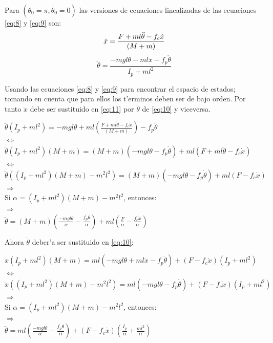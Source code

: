 Para $(\theta_{0}=\pi,\dot{\theta_{0}}=0)$ las versiones de ecuaciones linealizadas de las ecuaciones \ref{eq:8} y \ref{eq:9} son:
\setlength{\parskip}{0pt}
\begin{equation}\label{eq:10} 
\,\ddot{x}=\frac{F+ml\ddot{\theta}-f_{c}\dot{x}}{(M+m)}\\
\end{equation}
\begin{equation}\label{eq:11}
\,\ddot{\theta}=\frac{-mgl\theta-ml\ddot{x}-f_{p}\dot{\theta}}{I_{p}+ml^{2}}
\end{equation}
\setlength{\parskip}{0.4cm}


Usando las ecuaciones \ref{eq:8} y \ref{eq:9} para encontrar el espacio de estados; tomando en cuenta que para ellos los t'erminos deben ser de bajo orden. Por tanto $\ddot{x}$ debe ser sustituido en \ref{eq:11} por $\ddot{\theta}$ de \ref{eq:10} y viceversa.

\setlength{\parskip}{0pt}

\begin{center}
$\ddot{\theta}(I_{p}+ml^{2})=-mgl\theta+ml(\frac{F+ml\ddot{\theta}-f_{c}\dot{x}}{(M+m)})-f_{p}\dot{\theta}$\\
$\Leftrightarrow $\\
$\ddot{\theta}(I_{p}+ml^{2})(M+m)=(M+m)(-mgl\theta-f_{p}\dot{\theta})+ml(F+ml\ddot{\theta}-f_{c}\dot{x})$\\
$\Leftrightarrow $\\
$\ddot{\theta}((I_{p}+ml^{2})(M+m)-m^{2}l^{2})=(M+m)(-mgl\theta-f_{p}\dot{\theta})+ml(F-f_{c}\dot{x})$\\
$\Rightarrow $\\
Si $\alpha=(I_{p}+ml^{2})(M+m)-m^{2}l^{2}$, entonces:\\
$\Rightarrow $\\
$\ddot{\theta}=(M+m)(\frac{-mgl\theta}{\alpha}-\frac{f_{p}\dot{\theta}}{\alpha})+ml(\frac{F}{\alpha}-\frac{f_{c}\dot{x}}{\alpha})$\\
\end{center}

Ahora $\dot{\theta}$ deber'a ser sustituido en \ref{eq:10}:

\begin{center}
$\ddot{x}(I_{p}+ml^{2})(M+m)=ml(-mgl\theta+ml\ddot{x}-f_{p}\dot{\theta})+(F-f_{c}\dot{x})(I_{p}+ml^{2})$\\
$\Leftrightarrow $\\
$\ddot{x}((I_{p}+ml^{2})(M+m)-m^{2}l^{2})=ml(-mgl\theta-f_{p}\dot{\theta})+(F-f_{c}\dot{x})(I_{p}+ml^{2})$\\
$\Rightarrow $\\
Si $\alpha=(I_{p}+ml^{2})(M+m)-m^{2}l^{2}$, entonces:\\
$\Rightarrow $\\
$\ddot{\theta}=ml(\frac{-mgl\theta}{\alpha}-\frac{f_{p}\dot{\theta}}{\alpha})+(F-f_{c}\dot{x})(\frac{I_{p}}{\alpha}+\frac{ml^{2}}{\alpha})$\\
\end{center}


